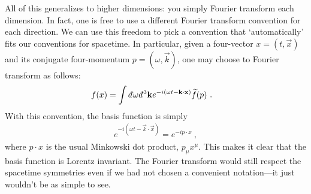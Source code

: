 All of this generalizes to higher dimensions: you simply Fourier transform each dimension. In fact, one is free to use a different Fourier transform convention for each direction. We can use this freedom to pick a convention that `automatically' fits our conventions for spacetime. In particular, given a four-vector $x=(t,\vec{x})$ and its conjugate four-momentum $p=(\omega, \vec{k})$, one may choose to Fourier transform as follows: 
\begin{align}
	f(x) &= \int \dbar\omega\dbar^3\vec{k} e^{-i(\omega t-\vec{k}\cdot\vec{x})} \tilde f(p)
	\ .
\end{align}
With this convention, the basis function is simply
\begin{align}
	e^{-i(\omega t-\vec{k}\cdot\vec{x})} 
	= e^{-ip\cdot x} \ , 
\end{align}
where $p\cdot x$ is the usual Minkowski dot product, $p_\mu x^\mu$. This makes it clear that the basis function is Lorentz invariant. The Fourier transform would still respect the spacetime symmetries even if we had not chosen a convenient notation---it just wouldn't be as simple to see.